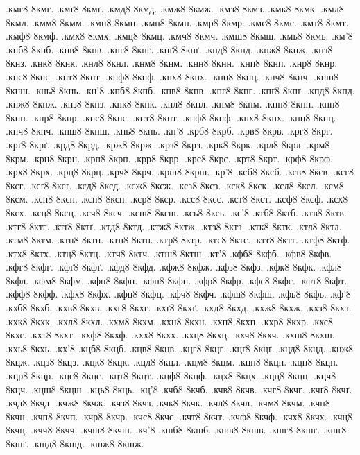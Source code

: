 {.кмг8 8кмг.
.кмґ8 8кмґ.
.кмд8 8кмд.
.кмж8 8кмж.
.кмз8 8кмз.
.кмк8 8кмк.
.кмл8 8кмл.
.кмм8 8кмм.
.кмн8 8кмн.
.кмп8 8кмп.
.кмр8 8кмр.
.кмс8 8кмс.
.кмт8 8кмт.
.кмф8 8кмф.
.кмх8 8кмх.
.кмц8 8кмц.
.кмч8 8кмч.
.кмш8 8кмш.
.кмь8 8кмь.
.км'8
.кнб8 8кнб.
.кнв8 8кнв.
.кнг8 8кнг.
.кнґ8 8кнґ.
.кнд8 8кнд.
.кнж8 8кнж.
.кнз8 8кнз.
.кнк8 8кнк.
.кнл8 8кнл.
.кнм8 8кнм.
.кнн8 8кнн.
.кнп8 8кнп.
.кнр8 8кнр.
.кнс8 8кнс.
.кнт8 8кнт.
.кнф8 8кнф.
.кнх8 8кнх.
.кнц8 8кнц.
.кнч8 8кнч.
.кнш8 8кнш.
.кнь8 8кнь.
.кн'8
.кпб8 8кпб.
.кпв8 8кпв.
.кпг8 8кпг.
.кпґ8 8кпґ.
.кпд8 8кпд.
.кпж8 8кпж.
.кпз8 8кпз.
.кпк8 8кпк.
.кпл8 8кпл.
.кпм8 8кпм.
.кпн8 8кпн.
.кпп8 8кпп.
.кпр8 8кпр.
.кпс8 8кпс.
.кпт8 8кпт.
.кпф8 8кпф.
.кпх8 8кпх.
.кпц8 8кпц.
.кпч8 8кпч.
.кпш8 8кпш.
.кпь8 8кпь.
.кп'8
.крб8 8крб.
.крв8 8крв.
.крг8 8крг.
.крґ8 8крґ.
.крд8 8крд.
.крж8 8крж.
.крз8 8крз.
.крк8 8крк.
.крл8 8крл.
.крм8 8крм.
.крн8 8крн.
.крп8 8крп.
.крр8 8крр.
.крс8 8крс.
.крт8 8крт.
.крф8 8крф.
.крх8 8крх.
.крц8 8крц.
.крч8 8крч.
.крш8 8крш.
.кр'8
.ксб8 8ксб.
.ксв8 8ксв.
.ксг8 8ксг.
.ксґ8 8ксґ.
.ксд8 8ксд.
.ксж8 8ксж.
.ксз8 8ксз.
.кск8 8кск.
.ксл8 8ксл.
.ксм8 8ксм.
.ксн8 8ксн.
.ксп8 8ксп.
.кср8 8кср.
.ксс8 8ксс.
.кст8 8кст.
.ксф8 8ксф.
.ксх8 8ксх.
.ксц8 8ксц.
.ксч8 8ксч.
.ксш8 8ксш.
.ксь8 8ксь.
.кс'8
.ктб8 8ктб.
.ктв8 8ктв.
.ктг8 8ктг.
.ктґ8 8ктґ.
.ктд8 8ктд.
.ктж8 8ктж.
.ктз8 8ктз.
.ктк8 8ктк.
.ктл8 8ктл.
.ктм8 8ктм.
.ктн8 8ктн.
.ктп8 8ктп.
.ктр8 8ктр.
.ктс8 8ктс.
.ктт8 8ктт.
.ктф8 8ктф.
.ктх8 8ктх.
.ктц8 8ктц.
.ктч8 8ктч.
.ктш8 8ктш.
.кт'8
.кфб8 8кфб.
.кфв8 8кфв.
.кфг8 8кфг.
.кфґ8 8кфґ.
.кфд8 8кфд.
.кфж8 8кфж.
.кфз8 8кфз.
.кфк8 8кфк.
.кфл8 8кфл.
.кфм8 8кфм.
.кфн8 8кфн.
.кфп8 8кфп.
.кфр8 8кфр.
.кфс8 8кфс.
.кфт8 8кфт.
.кфф8 8кфф.
.кфх8 8кфх.
.кфц8 8кфц.
.кфч8 8кфч.
.кфш8 8кфш.
.кфь8 8кфь.
.кф'8
.кхб8 8кхб.
.кхв8 8кхв.
.кхг8 8кхг.
.кхґ8 8кхґ.
.кхд8 8кхд.
.кхж8 8кхж.
.кхз8 8кхз.
.кхк8 8кхк.
.кхл8 8кхл.
.кхм8 8кхм.
.кхн8 8кхн.
.кхп8 8кхп.
.кхр8 8кхр.
.кхс8 8кхс.
.кхт8 8кхт.
.кхф8 8кхф.
.кхх8 8кхх.
.кхц8 8кхц.
.кхч8 8кхч.
.кхш8 8кхш.
.кхь8 8кхь.
.кх'8
.кцб8 8кцб.
.кцв8 8кцв.
.кцг8 8кцг.
.кцґ8 8кцґ.
.кцд8 8кцд.
.кцж8 8кцж.
.кцз8 8кцз.
.кцк8 8кцк.
.кцл8 8кцл.
.кцм8 8кцм.
.кцн8 8кцн.
.кцп8 8кцп.
.кцр8 8кцр.
.кцс8 8кцс.
.кцт8 8кцт.
.кцф8 8кцф.
.кцх8 8кцх.
.кцц8 8кцц.
.кцч8 8кцч.
.кцш8 8кцш.
.кць8 8кць.
.кц'8
.кчб8 8кчб.
.кчв8 8кчв.
.кчг8 8кчг.
.кчґ8 8кчґ.
.кчд8 8кчд.
.кчж8 8кчж.
.кчз8 8кчз.
.кчк8 8кчк.
.кчл8 8кчл.
.кчм8 8кчм.
.кчн8 8кчн.
.кчп8 8кчп.
.кчр8 8кчр.
.кчс8 8кчс.
.кчт8 8кчт.
.кчф8 8кчф.
.кчх8 8кчх.
.кчц8 8кчц.
.кчч8 8кчч.
.кчш8 8кчш.
.кч'8
.кшб8 8кшб.
.кшв8 8кшв.
.кшг8 8кшг.
.кшґ8 8кшґ.
.кшд8 8кшд.
.кшж8 8кшж.
}
